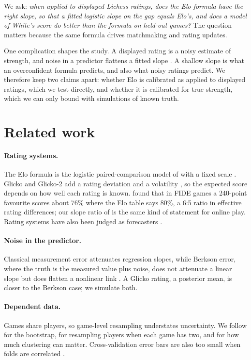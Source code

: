 \documentclass{article}
\begin{document}
We ask: \emph{when applied to displayed Lichess ratings, does the Elo formula have the right slope, so that a fitted logistic slope on the gap equals Elo's, and does a model of White's score do better than the formula on held-out games?} The question matters because the same formula drives matchmaking and rating updates.

One complication shapes the study. A displayed rating is a noisy estimate of strength, and noise in a predictor flattens a fitted slope \citep{carroll2006}. A shallow slope is what an overconfident formula predicts, and also what noisy ratings predict. We therefore keep two claims apart: whether Elo is calibrated as applied to displayed ratings, which we test directly, and whether it is calibrated for true strength, which we can only bound with simulations of known truth.

\section{Related work}

\paragraph{Rating systems.} The Elo formula is the logistic paired-comparison model of \citet{bradley1952} with a fixed scale \citep{elo1978}. Glicko and Glicko-2 add a rating deviation and a volatility \citep{glickman1999,glickman2001}, so the expected score depends on how well each rating is known. \citet{sonas2011} found that in FIDE games a 240-point favourite scores about 76\% where the Elo table says 80\%, a 6:5 ratio in effective rating differences; our slope ratio of \SlopeAllJan{} is the same kind of statement for online play. Rating systems have also been judged as forecasters \citep{hvattum2010}.

\paragraph{Noise in the predictor.} Classical measurement error attenuates regression slopes, while Berkson error, where the truth is the measured value plus noise, does not attenuate a linear slope but does flatten a nonlinear link \citep{berkson1950,carroll2006}. A Glicko rating, a posterior mean, is closer to the Berkson case; we simulate both.

\paragraph{Dependent data.} Games share players, so game-level resampling understates uncertainty. We follow \citet{efron1993} for the bootstrap, \citet{owen2007} for resampling players when each game has two, and \citet{cameron2011} for how much clustering can matter. Cross-validation error bars are also too small when folds are correlated \citep{bates2024}.
\end{document}
